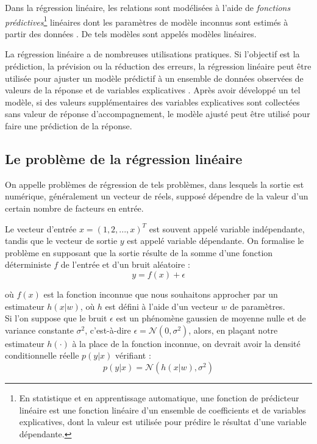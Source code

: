 	Dans la régression linéaire, les relations sont modélisées à l'aide de \textit{fonctions prédictives}\footnote{En statistique et en apprentissage automatique, une fonction de prédicteur linéaire est une fonction linéaire d'un ensemble de coefficients et de variables explicatives, dont la valeur est utilisée pour prédire le résultat d'une variable dépendante.} linéaires dont les paramètres de modèle inconnus sont estimés à partir des données \cite{matloff2017statistical}. De tels modèles sont appelés modèles linéaires.
	
	La régression linéaire a de nombreuses utilisations pratiques. Si l'objectif est la prédiction, la prévision ou la réduction des erreurs, la régression linéaire peut être utilisée pour ajuster un modèle prédictif à un ensemble de données observées de valeurs de la réponse et de variables explicatives \cite{darlington2016regression}. Après avoir développé un tel modèle, si des valeurs supplémentaires des variables explicatives sont collectées sans valeur de réponse d'accompagnement, le modèle ajusté peut être utilisé pour faire une prédiction de la réponse.
	
	
	
	
	\subsection{Le problème de la régression linéaire}
		On appelle problèmes de régression de tels problèmes, dans lesquels la sortie est numérique, généralement un vecteur de réels, supposé dépendre de la valeur d'un certain nombre de facteurs en entrée.
		
		Le vecteur d'entrée $x = (1,2,...,x)^T$ est souvent appelé variable indépendante, tandis que le vecteur de sortie $y$ est appelé variable dépendante. On formalise le problème en supposant que la sortie résulte de la somme d'une fonction déterministe $f$ de l'entrée et d'un bruit aléatoire :
		\begin{equation}
			y = f(x) + \epsilon
		\end{equation}
	
		où $f(x)$ est la fonction inconnue que nous souhaitons approcher par un estimateur $h(x|w)$, où $h$ est défini à l'aide d'un vecteur $w$ de paramètres.\\
		Si l'on suppose que le bruit $\epsilon$ est un phénomène gaussien de moyenne nulle et de variance constante $\sigma^2$, c'est-à-dire $ \epsilon = \mathcal{N}(0,\sigma^2)$, alors, en plaçant notre estimateur $h(\cdot)$ à la place de la fonction inconnue, on devrait avoir la densité conditionnelle réelle $p(y|x)$ vérifiant :
		\begin{equation}
			p(y|x) = \mathcal{N}(h(x|w),\sigma^2)
		\end{equation}
		

